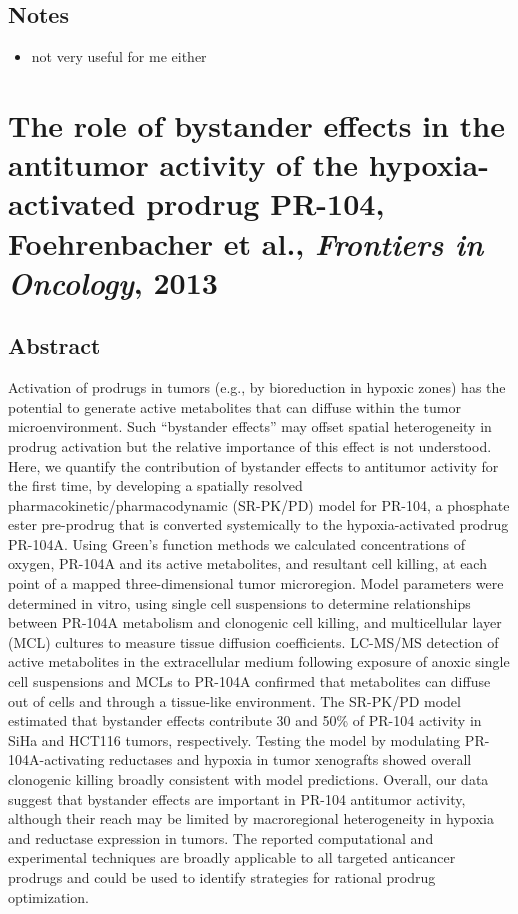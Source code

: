 \documentclass[11pt,a4paper]{article}
\begin{document}
\subsection*{Notes}
\begin{itemize}
\item not very useful for me either
\end{itemize}

\section*{The role of bystander effects in the antitumor activity of the hypoxia-activated prodrug PR-104, Foehrenbacher et al., \textit{Frontiers in Oncology}, 2013}
\subsection*{Abstract}
Activation of prodrugs in tumors (e.g., by bioreduction in hypoxic zones) has the potential to generate active metabolites that can diffuse within the tumor microenvironment. Such “bystander effects” may offset spatial heterogeneity in prodrug activation but the relative importance of this effect is not understood. Here, we quantify the contribution of bystander effects to antitumor activity for the first time, by developing a spatially resolved pharmacokinetic/pharmacodynamic (SR-PK/PD) model for PR-104, a phosphate ester pre-prodrug that is converted systemically to the hypoxia-activated prodrug PR-104A. Using Green’s function methods we calculated concentrations of oxygen, PR-104A and its active metabolites, and resultant cell killing, at each point of a mapped three-dimensional tumor microregion. Model parameters were determined in vitro, using single cell suspensions to determine relationships between PR-104A metabolism and clonogenic cell killing, and multicellular layer (MCL) cultures to measure tissue diffusion coefficients. LC-MS/MS detection of active metabolites in the extracellular medium following exposure of anoxic single cell suspensions and MCLs to PR-104A confirmed that metabolites can diffuse out of cells and through a tissue-like environment. The SR-PK/PD model estimated that bystander effects contribute 30 and 50\% of PR-104 activity in SiHa and HCT116 tumors, respectively. Testing the model by modulating PR-104A-activating reductases and hypoxia in tumor xenografts showed overall clonogenic killing broadly consistent with model predictions. Overall, our data suggest that bystander effects are important in PR-104 antitumor activity, although their reach may be limited by macroregional heterogeneity in hypoxia and reductase expression in tumors. The reported computational and experimental techniques are broadly applicable to all targeted anticancer prodrugs and could be used to identify strategies for rational prodrug optimization.
\end{document}
